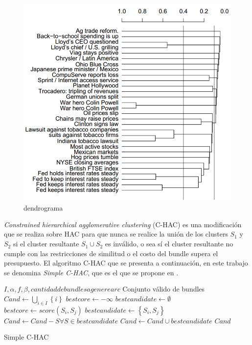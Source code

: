 \begin{figure}[H]
  \centering
    \includegraphics[width=1\textwidth]{img/Dendrogram.png}
  \caption{dendrograma}
  \label{des:Dendrogram}
\end{figure}

\textit{Constrained hierarchical agglomerative clustering} (C-HAC) es una modificación que se realiza sobre HAC para que nunca se realice la unión de los clusters $S_1$ y $S_2$ si el cluster resultante $S_1 \cup S_2$ es inválido, o sea sí el cluster resultante no cumple con las restricciones de similitud o el costo del bundle supera el presupuesto. El algoritmo C-HAC que se presenta a continuación, en este trabajo se denomina \textit{Simple C-HAC}, que es el que se propone en \cite{compositeRetrival}.\\

\begin{algorithm}[H]
\begin{algorithmic}[1]
\REQUIRE $I, \alpha, f, \beta, cantidad de bundles a generear c $
\ENSURE Conjunto válido de bundles
\STATE $Cand \leftarrow \bigcup_{i \in I}\left\{i\right\}$
\STATE $bestcore \leftarrow -\infty$
\STATE $bestcandidate \leftarrow \emptyset$
 \label{validMerge}
 \label{score}
\STATE $bestcore \leftarrow score(S_i,S_j)$
\STATE $bestcandidate \leftarrow \left\{S_i,S_j\right\}$
\ENDIF
\ENDIF
\ENDFOR
\ENDFOR
{}
\BREAK
\ENDIF
\STATE $Cand \leftarrow Cand - S \forall S \in bestcandidate$
\STATE $Cand \leftarrow Cand \cup bestcandidate $
\ENDWHILE
\RETURN $Cand$
\end{algorithmic}
\caption{Simple C-HAC}\label{alg:SimpleC-HAC}
\end{algorithm}

